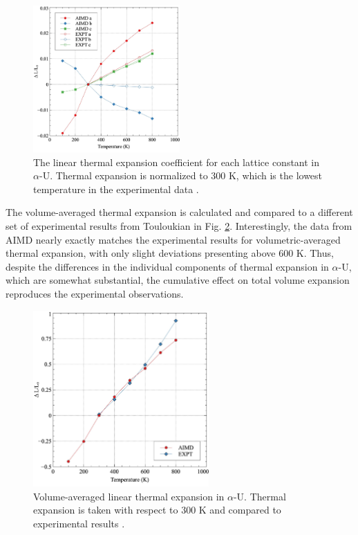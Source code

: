 \documentclass[utf8]{frontiersSCNS} %
\begin{document}
 \begin{figure}[hbt]
	\centering
	\includegraphics[width=0.5\textwidth]{lte.jpg}
    \caption{The linear thermal expansion coefficient for each lattice constant in $\alpha$-U. Thermal expansion is normalized to 300 K, which is the lowest temperature in the experimental data \cite{touloukian}. }\label{fig:exp}
\end{figure}

\FloatBarrier

The volume-averaged thermal expansion is calculated and compared to a different set of experimental results from Touloukian \cite{touloukian} in Fig. \ref{fig:vol}. Interestingly, the data from AIMD nearly exactly matches the experimental results for volumetric-averaged thermal expansion, with only slight deviations presenting above 600 K. Thus, despite the differences in the individual components of thermal expansion in $\alpha$-U, which are somewhat substantial, the cumulative effect on total volume expansion reproduces the experimental observations. 

 \begin{figure}[hbt]
	\centering
	\includegraphics[width=0.6\textwidth]{vte.jpg}
    \caption{Volume-averaged linear thermal expansion in $\alpha$-U. Thermal expansion is taken with respect to 300 K and compared to experimental results \cite{touloukian}.}\label{fig:vol}
\end{figure}
\end{document}
